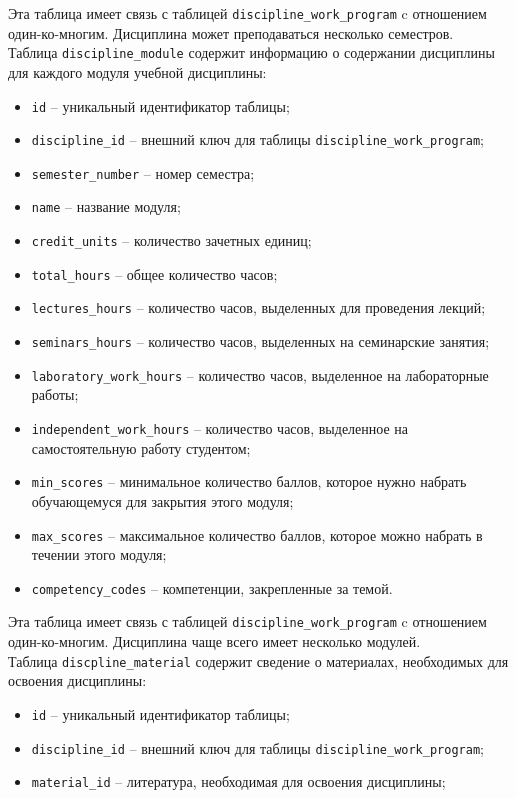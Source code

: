 Эта таблица имеет связь с таблицей \texttt{discipline\_work\_program} c отношением один-ко-многим. Дисциплина может преподаваться несколько семестров.\\

Таблица \texttt{discipline\_module} содержит информацию о содержании дисциплины для каждого модуля учебной дисциплины:

\begin{itemize}
	\item \texttt{id} -- уникальный идентификатор таблицы;
	\item \texttt{discipline\_id} -- внешний ключ для таблицы \texttt{discipline\_work\_program};
	\item \texttt{semester\_number} -- номер семестра;
	\item \texttt{name} -- название модуля;
	\item \texttt{credit\_units} -- количество зачетных единиц;
	\item \texttt{total\_hours} -- общее количество часов;
	\item \texttt{lectures\_hours} -- количество часов, выделенных для проведения лекций;
	\item \texttt{seminars\_hours} -- количество часов, выделенных на семинарские занятия;
	\item \texttt{laboratory\_work\_hours} -- количество часов, выделенное на лабораторные работы;
	\item \texttt{independent\_work\_hours} -- количество часов, выделенное на самостоятельную работу студентом;
	\item \texttt{min\_scores} -- минимальное количество баллов, которое нужно набрать обучающемуся для закрытия этого модуля;
	\item \texttt{max\_scores} -- максимальное количество баллов, которое можно набрать в течении этого модуля;
	\item \texttt{competency\_codes} -- компетенции, закрепленные за темой.
\end{itemize}

Эта таблица имеет связь с таблицей \texttt{discipline\_work\_program} c отношением один-ко-многим. Дисциплина чаще всего имеет несколько модулей.\\

Таблица \texttt{discpline\_material} содержит сведение о материалах, необходимых для освоения дисциплины:

\begin{itemize}
	\item \texttt{id} -- уникальный идентификатор таблицы;
	\item \texttt{discipline\_id} -- внешний ключ для таблицы \texttt{discipline\_work\_program};
	\item \texttt{material\_id} -- литература, необходимая для освоения дисциплины;
\end{itemize}

